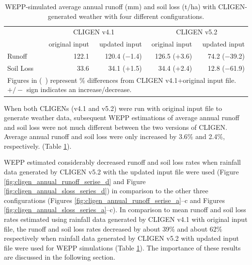 \begin{table}[htbp]
  \centering
  \caption[WEPP-simulated average annual runoff and soil loss]{WEPP-simulated
average annual runoff (mm) and soil loss (t/ha) with CLIGEN-generated
weather with four different configurations.}
  \label{tab:SimualtedAnnualRunoffAndSoilLossWithDifferentConfiguration}
    \begin{tabular}{lrrrr}
      \toprule
       & \multicolumn{2}{c}{CLIGEN v4.1} &
\multicolumn{2}{c}{CLIGEN v5.2}\\
      \cmidrule(r){2-3}\cmidrule(l){4-5}
       & original input & updated input & original input &
updated input \\
      \midrule
      Runoff & 122.1 & 120.4 ($-$1.4) & 126.5 ($+$3.6) & 74.2 ($-$39.2)\\
      Soil Loss & 33.6 & 34.1 ($+$1.5) & 34.4 ($+$2.4) & 12.8 ($-$61.9)\\
      \bottomrule
      \multicolumn{5}{p{10.5cm}}{\footnotesize Figures in (\ )
represent \% differences from CLIGEN v4.1+original input file. $+/-$ sign
indicates an increase/decrease.}
    \end{tabular}
\end{table}

When both CLIGENs (v4.1 and v5.2) were run with original input file to generate
weather data, subsequent WEPP estimations of average annual runoff and soil loss
were not much different between the two versions of CLIGEN. Average annual
runoff and soil loss were only increased by 3.6\% and 2.4\%, respectively.
(Table \ref{tab:SimualtedAnnualRunoffAndSoilLossWithDifferentConfiguration}).

WEPP estimated considerably decreased runoff and soil loss rates when rainfall
data generated by CLIGEN v5.2 with the updated input file were used (Figure
\ref{fig:cligen_annual_runoff_serise_d} and Figure
\ref{fig:cligen_annual_sloss_series_d}) in comparison to the other three
configurations (Figures \ref{fig:cligen_annual_runoff_serise_a}--c and Figures
\ref{fig:cligen_annual_sloss_series_a}--c). In comparison to mean runoff and
soil loss rates estimated using rainfall data generated by CLIGEN v4.1 with
original input file, the runoff and soil loss rates decreased by about 39\% and
about 62\% respectively when rainfall data generated by CLIGEN v5.2 with updated
input file were used for WEPP simulations (Table
\ref{tab:SimualtedAnnualRunoffAndSoilLossWithDifferentConfiguration}).
The importance of these results are discussed in the following section.

